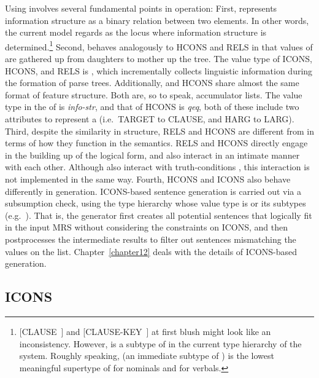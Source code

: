 Using  involves several fundamental points in operation:
First,  represents information structure as a
binary relation between two elements. In other words, the current
model regards  as the locus where information structure is
determined.\footnote{\mbox{[CLAUSE ]} and
  \mbox{[CLAUSE-KEY ]} at first blush might look like an
  inconsistency. However,  is a
  subtype of  in the current type hierarchy of the
  \lingo {} system. Roughly speaking,
   (an immediate subtype of ) is the lowest
  meaningful supertype of  for nominals and 
  for verbals.}  Second,  behaves analogously to HCONS and
RELS in that values of  are gathered up from daughters
to mother up the tree. The value type of ICONS, HCONS, and RELS is
, which incrementally collects linguistic information
during the formation of parse trees.  Additionally,  and
HCONS share almost the same format of feature structure. Both are, so
to speak, accumulator lists. The value type in the  of
 is \textit{info-str}, and that of HCONS is \textit{qeq},
both of these include two attributes to represent a  (i.e.\ TARGET to CLAUSE, and HARG to
LARG). Third, despite the similarity in
structure, RELS and HCONS are different from  in terms of
how they function in the semantics.  RELS and HCONS directly engage in
the building up of the logical form, and also interact in an intimate
manner with each other. Although  also interact with
truth-conditions \citep{partee:91}, this interaction is not
implemented in the same way.  Fourth, HCONS and ICONS also behave
differently in generation. ICONS-based sentence generation is carried
out via a subsumption check, using the type hierarchy whose value type
is  or its subtypes
(e.g.\ ). That is, the generator
first creates all potential sentences that logically fit in the input
MRS without considering the constraints on ICONS, and then
postprocesses the intermediate results to filter out sentences
mismatching the values on the 
list. Chapter~\ref{chapter12} deals with the details of ICONS-based
generation.



\subsection{ICONS}
\label{9:ssec:icons}


